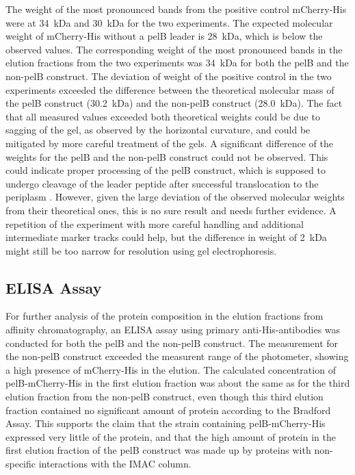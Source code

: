 \documentclass[a4paper,12pt]{article}
\begin{document}
The weight of the most pronounced bands from the positive control mCherry-His were at 34~kDa and 30~kDa for the two experiments. The expected molecular weight of mCherry-His without a pelB leader is 28~kDa, which is below the observed values. The corresponding weight of the most pronounced bands in the elution fractions from the two experiments was 34~kDa for both the pelB and the non-pelB construct. The deviation of weight of the positive control in the two experiments exceeded the difference between the theoretical molecular mass of the pelB construct (30.2~kDa) and the non-pelB construct (28.0~kDa). The fact that all measured values exceeded both theoretical weights could be due to sagging of the gel, as observed by the horizontal curvature, and could be mitigated by more careful treatment of the gels. A significant difference of the weights for the pelB and the non-pelB construct could not be observed. This could indicate proper processing of the pelB construct, which is supposed to undergo cleavage of the leader peptide after successful translocation to the periplasm \cite{Sockolosky2013}. However, given the large deviation of the observed molecular weights from their theoretical ones, this is no sure result and needs further evidence. A repetition of the experiment with more careful handling and additional intermediate marker tracks could help, but the difference in weight of 2~kDa might still be too narrow for resolution using gel electrophoresis.


\subsection{ELISA Assay}
For further analysis of the protein composition in the elution fractions from affinity chromatography, an ELISA assay using primary anti-His-antibodies was conducted for both the pelB and the non-pelB construct. The measurement for the non-pelB construct exceeded the measurent range of the photometer, showing a high presence of mCherry-His in the elution. The calculated concentration of pelB-mCherry-His in the first elution fraction was about the same as for the third elution fraction from the non-pelB construct, even though this third elution fraction contained no significant amount of protein according to the Bradford Assay. This supports the claim that the strain containing pelB-mCherry-His expressed very little of the protein, and that the high amount of protein in the first elution fraction of the pelB construct was made up by proteins with non-specific interactions with the IMAC column. 
\end{document}
